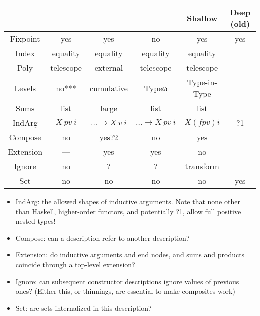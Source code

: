 \begin{tabular}{c | c c c c c}
             & \cite{sijsling} & \cite{effectfully} & \cite{practgen} & Shallow   & Deep (old) \\
    \hline   
    Fixpoint & yes             & yes                & no              & yes       & yes     \\
    Index    & equality        & equality           & equality        & equality  &         \\
    Poly     & telescope       & external           & telescope       & telescope &         \\
    Levels   & no***           & cumulative         & Typeω           & Type-in-Type &         \\
    Sums     & list            & large              & list            & list      &         \\
    IndArg   & $X\ pv\ i$      & $\dots\to X\ v\ i$ & $\dots\to X\ pv\ i$ & $X (f pv) i$ & ?1 \\
    Compose  & no              & yes?2              & no              & yes       &         \\
    Extension& —               & yes                & yes             & no        &         \\
    Ignore   & no              & ?                  & ?               & transform &         \\
    Set      & no              & no                 & no              & no        & yes     \\
\end{tabular}



\begin{itemize}
    \item IndArg: the allowed shapes of inductive arguments. Note that none other than Haskell, higher-order functors, and potentially ?1, allow full positive nested types!
    \item Compose: can a description refer to another description?
    \item Extension: do inductive arguments and end nodes, and sums and products coincide through a top-level extension?
    \item Ignore: can subsequent constructor descriptions ignore values of previous ones? (Either this, or thinnings, are essential to make composites work)
    \item Set: are sets internalized in this description?
\end{itemize}

